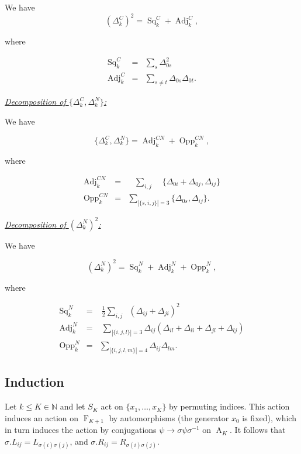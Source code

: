 \documentclass[12pt]{amsart}
\theoremstyle{definition}
\numberwithin{figure}{section}
\numberwithin{table}{section}
\numberwithin{equation}{section}
\newcommand{\F}{\operatorname{F}}
\newcommand{\A}{\operatorname{A}}
\newcommand{\Adj}{\operatorname{Adj}}
\newcommand{\Sq}{\operatorname{Sq}}
\newcommand{\Opp}{\operatorname{Opp}}
\newcommand{\BB}[1]{{\mathbb #1}}
\begin{document}
We have
$$
(\Delta_k^C)^2 = \Sq_k^C + \Adj_k^C,
$$

where 

\[
\begin{array}{lll}
\Sq_k^C &= &\displaystyle \sum_{s}\Delta_{\mathrm{0}s}^2 \\[1.5em]
\Adj_k^C &=&\displaystyle  \sum_{s\neq t}\Delta_{\mathrm{0}s}\Delta_{\mathrm{0}t}.
\end{array}
\]

\underline{\textit{Decomposition of $\{\Delta_k^C,\Delta_k^N\}$:}}

We have 

$$
\{\Delta_k^C,\Delta_k^N\} = \Adj_k^{CN} + \Opp_k^{CN},
$$

where 

\[
\begin{array}{lll}
\Adj_k^{CN} &=& \;\;\;\displaystyle \sum_{i,j}\;\;\;\;\{\Delta_{\mathrm{0}i}+\Delta_{\mathrm{0}j},\Delta_{ij}\}\\[1.5em]
\Opp_k^{CN} &=& \displaystyle \sum_{|\{s,i,j\}|=3}\{\Delta_{\mathrm{0}s},\Delta_{ij}\}.
\end{array}
\]


\underline{\textit{Decomposition of $(\Delta_k^N)^2$:}}

We have

$$
(\Delta_k^N)^2 = \Sq_k^N+\Adj_k^N+\Opp_k^N,
$$

where 

\[
\begin{array}{lll}
\Sq_k^N &=& \; \displaystyle \frac{1}{2}\sum_{i,j}\;\;(\Delta_{ij}+\Delta_{ji})^2\\[1.5em]
\Adj_k^N &=& \;\displaystyle  \sum_{|\{i,j,l\}|=3}\Delta_{ij}(\Delta_{il}+\Delta_{li}+\Delta_{jl}+\Delta_{lj})\\[1.5em]
\Opp_k^N &=& \displaystyle \sum_{|\{i,j,l,m\}| = 4\!\!\!\!}\Delta_{ij}\Delta_{lm}.
\end{array}
\]

\subsection{Induction}\label{ss:induction}

Let $k \leq K \in \BB N$ and let $S_K$ act on $\{x_1,\ldots,x_K\}$ by permuting indices. This action induces an action on $\F_{K+1}$ by automorphisms (the generator $x_0$ is fixed), which in turn induces the action by conjugations $\psi \to \sigma\psi\sigma^{-1}$ on $\A_K$. It follows that $\sigma.L_{ij} = L_{\sigma(i)\sigma(j)}$, and $\sigma.R_{ij} = R_{\sigma(i)\sigma(j)}$. 
\end{document}
